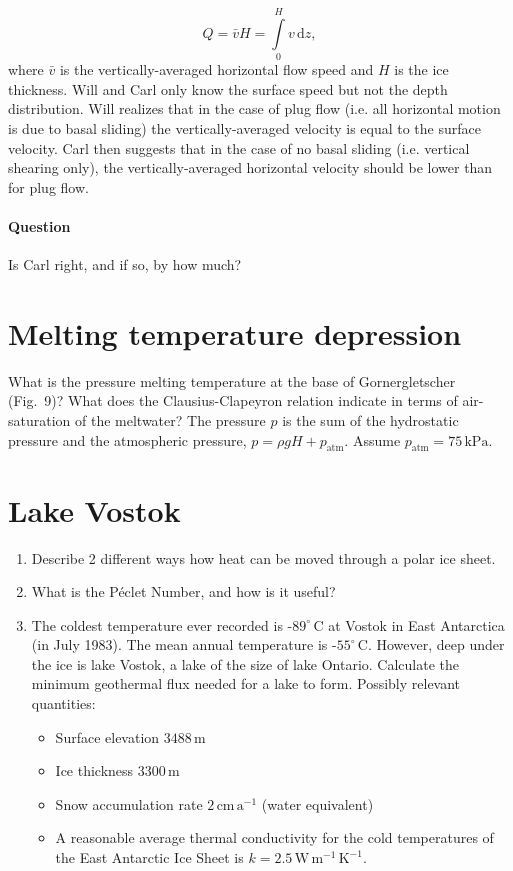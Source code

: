 \documentclass[parskip=half]{scrartcl}
\newcommand{\cels}[1]{\ensuremath{#1^{\circ}\,\mathrm{C}}}
\begin{document}
\begin{equation}
Q = \bar v H = \int \limits_0^H v\, \mathrm{d}z,
\end{equation}
where $\bar v$ is the vertically-averaged horizontal flow speed and $H$ is the ice thickness. Will and Carl only know the surface speed but not the depth distribution. Will realizes that in the case of plug flow (i.e. all horizontal motion is due to basal sliding) the vertically-averaged velocity is equal to the surface velocity. Carl then suggests that in the case of no basal sliding (i.e. vertical shearing only), the vertically-averaged horizontal velocity should be lower than for plug flow.

\paragraph{Question} Is Carl right, and if so, by how much?

\section{Melting temperature depression}

What is the pressure melting temperature at the base of Gornergletscher (Fig.~9)? What does the Clausius-Clapeyron relation indicate in terms of air-saturation of the meltwater? The pressure $p$ is the sum of the hydrostatic pressure and the atmospheric pressure, $p = \rho g H + p_{\text{atm}}$. Assume $p_{\text{atm}} = 75\,\text{kPa}$.

\section{Lake Vostok}

\begin{enumerate}
\item Describe 2 different ways how heat can be moved through a polar ice sheet.
\item What is the P\'eclet Number, and how is it useful?
\item The coldest temperature ever recorded is -\cels{89} at Vostok in East Antarctica (in July 1983). The mean annual temperature is -\cels{55}. However, deep under the ice is lake Vostok, a lake of the size of lake Ontario. Calculate the minimum geothermal flux needed for a lake to form. Possibly relevant quantities:
  \begin{itemize}
  \item Surface elevation $3488\,\text{m}$
  \item Ice thickness $3300\,\text{m}$
  \item Snow accumulation rate $2\,\text{cm}\,\text{a}^{-1}$ (water equivalent)
  \item A reasonable average thermal conductivity for the cold temperatures of the East Antarctic Ice Sheet is $k = 2.5\,\text{W}\,\text{m}^{−1}\,\text{K}^{−1}$.
  \end{itemize}
\end{enumerate}

\end{document}
